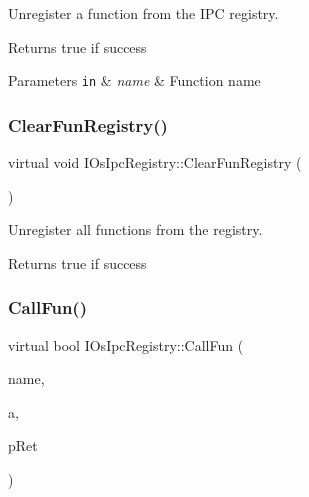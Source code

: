 Unregister a function from the I\+PC registry. 

\begin{DoxyReturn}{Returns}
true if success 
\end{DoxyReturn}

\begin{DoxyParams}[1]{Parameters}
\mbox{\tt in}  & {\em name} & Function name \\
\hline
\end{DoxyParams}
\mbox{\label{classIOsIpcRegistry_a6b4ffa30ef275d63227dbd5c5d586802}} 
\subsubsection{\texorpdfstring{Clear\+Fun\+Registry()}{ClearFunRegistry()}}
{\footnotesize\ttfamily virtual void I\+Os\+Ipc\+Registry\+::\+Clear\+Fun\+Registry (\begin{DoxyParamCaption}{ }\end{DoxyParamCaption})\hspace{0.3cm}{\ttfamily [pure virtual]}}



Unregister all functions from the registry. 

\begin{DoxyReturn}{Returns}
true if success 
\end{DoxyReturn}
\mbox{\label{classIOsIpcRegistry_af123e37a919ea2d2026976857bdb3199}} 
\subsubsection{\texorpdfstring{Call\+Fun()}{CallFun()}}
{\footnotesize\ttfamily virtual bool I\+Os\+Ipc\+Registry\+::\+Call\+Fun (\begin{DoxyParamCaption}\item[{std\+::string}]{name,  }\item[{\hyperlink{structTOsIpcFunArg}{T\+Os\+Ipc\+Fun\+Arg}}]{a,  }\item[{\hyperlink{unionTOsIpcArg}{T\+Os\+Ipc\+Arg} $\ast$}]{p\+Ret }\end{DoxyParamCaption})\hspace{0.3cm}{\ttfamily [pure virtual]}}



